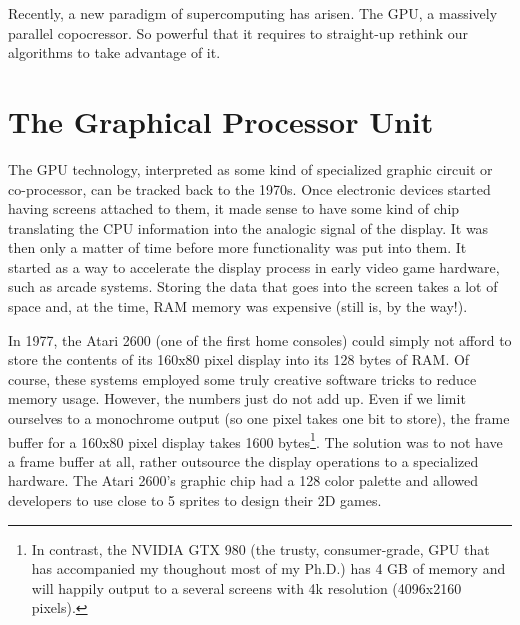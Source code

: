 \documentclass[ twoside,openright,titlepage,numbers=noenddot,%
headinclude,footinclude,cleardoublepage=empty,abstract=on,
BCOR=5mm,paper=a4,fontsize=11pt, dvipsnames
]{scrreprt}
\newcommand{\gpu}{\gls{GPU}\xspace}
\begin{document}
Recently, a new paradigm of supercomputing has arisen. The \gpu, a massively parallel copocressor. So powerful that it requires to straight-up rethink our algorithms to take advantage of it.

\section{The Graphical Processor Unit}

The \gpu technology, interpreted as some kind of specialized graphic circuit or co-processor, can be tracked back to the 1970s. Once electronic devices started having screens attached to them, it made sense to have some kind of chip translating the CPU information into the analogic signal of the display. It was then only a matter of time before more functionality was put into them. It started as a way to accelerate the display process in early video game hardware, such as arcade systems.
Storing the data that goes into the screen takes a lot of space and, at the time, RAM memory was expensive (still is, by the way!).

In 1977, the Atari 2600 (one of the first home consoles) could simply not afford to store the contents of its 160x80 pixel display into its 128 bytes of RAM. Of course, these systems employed some truly creative software tricks to reduce memory usage. However, the numbers just do not add up. Even if we limit ourselves to a monochrome output (so one pixel takes one bit to store), the frame buffer for a 160x80 pixel display takes 1600 bytes\footnote{In contrast, the NVIDIA GTX 980 (the trusty, consumer-grade, GPU that has accompanied my thoughout most of my Ph.D.) has 4 GB of memory and will happily output to a several screens with 4k resolution (4096x2160 pixels).}.
The solution was to not have a frame buffer at all, rather outsource the display operations to a specialized hardware. The Atari 2600's graphic chip had a 128 color palette and allowed developers to use close to 5 sprites to design their 2D games.
\end{document}
